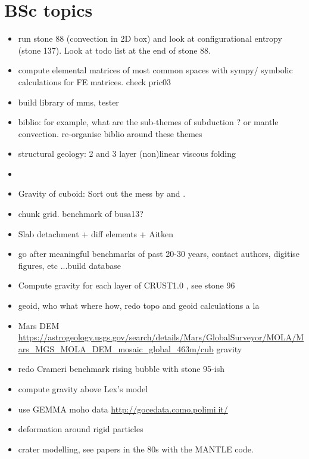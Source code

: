 \documentclass[a4paper]{article}
\begin{document}
\newpage
\section{BSc topics}

\begin{itemize}
\item run stone 88 (convection in 2D box) and look at configurational entropy 
(stone 137). Look at todo list at the end of stone 88.
\item compute elemental matrices of most common spaces with sympy/ symbolic calculations for FE matrices.
      check pric03
\item build library of mms, tester
\item biblio: for example, what are the sub-themes of subduction ? 
or mantle convection. re-organise biblio around these themes
\item structural geology: 2 and 3 layer (non)linear viscous folding
\item {}
\item Gravity of cuboid: Sort out the mess by \textcite{duti16} and \textcite{zhhu17}.
\item chunk grid. benchmark of busa13?
\item Slab detachment + diff elements + Aitken
\item go after meaningful benchmarks of past 20-30 years, contact authors, digitise figures, etc ...build database
\item Compute gravity for each layer of CRUST1.0 , see stone 96
\item geoid, who what where how, redo topo and geoid calculations a la \cite{king09}
\item Mars DEM \url{https://astrogeology.usgs.gov/search/details/Mars/GlobalSurveyor/MOLA/Mars_MGS_MOLA_DEM_mosaic_global_463m/cub} gravity
\item redo Crameri benchmark rising bubble with stone 95-ish
\item compute gravity above Lex's model \cite{furc15}
\item use GEMMA moho data \url{http://gocedata.como.polimi.it/} \cite{resa15} 
\item deformation around rigid particles \cite{ilma93}
\item crater modelling, see papers in the 80s with the MANTLE code.
\end{itemize}


\end{document}
